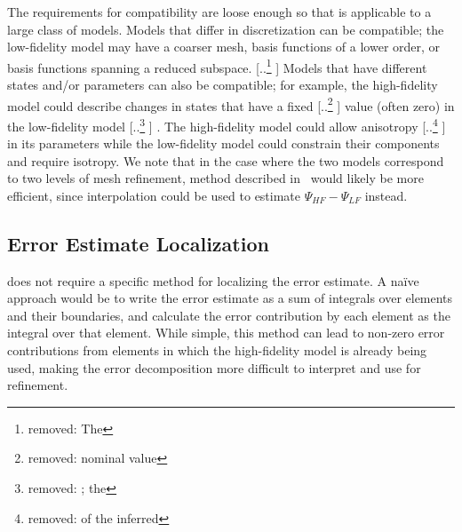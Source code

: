 \documentclass[review,sort&compress]{elsarticle}
\providecommand{\DIFaddtex}[1]{{\protect\color{blue} \sf #1}} %
\providecommand{\DIFdeltex}[1]{{\protect\color{red} [..\footnote{removed: #1} ]}} %
\providecommand{\DIFaddbegin}{} %
\providecommand{\DIFaddend}{} %
\providecommand{\DIFdelbegin}{} %
\providecommand{\DIFdelend}{} %
\providecommand{\DIFadd}[1]{\texorpdfstring{\DIFaddtex{#1}}{#1}} %
\providecommand{\DIFdel}[1]{\texorpdfstring{\DIFdeltex{#1}}{}} %
\newcommand{\DIFscaledelfig}{0.5}
\newlength{\DIFdelgraphicswidth} %
\newlength{\DIFdelgraphicsheight} %
\newcommand{\DIFaddincludegraphics}[2][]{{\color{blue}\fbox{\DIFOincludegraphics[#1]{#2}}}} %
\newcommand{\DIFdelincludegraphics}[2][]{%
\sbox{\DIFdelgraphicsbox}{\DIFOincludegraphics[#1]{#2}}%
\settoboxwidth{\DIFdelgraphicswidth}{\DIFdelgraphicsbox} %
\settoboxtotalheight{\DIFdelgraphicsheight}{\DIFdelgraphicsbox} %
\scalebox{\DIFscaledelfig}{%
\parbox[b]{\DIFdelgraphicswidth}{\usebox{\DIFdelgraphicsbox}\\[-\baselineskip] \rule{\DIFdelgraphicswidth}{0em}}\llap{\resizebox{\DIFdelgraphicswidth}{\DIFdelgraphicsheight}{%
\setlength{\unitlength}{\DIFdelgraphicswidth}%
\begin{picture}(1,1)%
\thicklines\linethickness{2pt} %
{\color[rgb]{1,0,0}\put(0,0){\framebox(1,1){}}}%
{\color[rgb]{1,0,0}\put(0,0){\line( 1,1){1}}}%
{\color[rgb]{1,0,0}\put(0,1){\line(1,-1){1}}}%
\end{picture}%
}\hspace*{3pt}}} %
} %
\DeclareRobustCommand{\DIFaddbegin}{\DIFOaddbegin \let\includegraphics\DIFaddincludegraphics} %
\DeclareRobustCommand{\DIFaddend}{\DIFOaddend \let\includegraphics\DIFOincludegraphics} %
\DeclareRobustCommand{\DIFdelbegin}{\DIFOdelbegin \let\includegraphics\DIFdelincludegraphics} %
\DeclareRobustCommand{\DIFdelend}{\DIFOaddend \let\includegraphics\DIFOincludegraphics} %
\begin{document}
\DIFadd{The requirements for compatibility are loose enough so that \Cref{alg:refSeries} is applicable to a large class of models. Models that differ in discretization can be compatible; the }\DIFaddend low-fidelity model may have a coarser mesh, basis functions of a lower order, or basis functions spanning a reduced subspace. \DIFdelbegin \DIFdel{The }\DIFdelend \DIFaddbegin \DIFadd{Models that have different states and/or parameters can also be compatible; for example, the }\DIFaddend high-fidelity model could describe changes in states that have a fixed \DIFdelbegin \DIFdel{nominal value }\DIFdelend \DIFaddbegin \DIFadd{value (often zero) }\DIFaddend in the low-fidelity model\DIFdelbegin \DIFdel{; the }\DIFdelend \DIFaddbegin \DIFadd{. The }\DIFaddend high-fidelity model could allow anisotropy \DIFdelbegin \DIFdel{of the inferred }\DIFdelend \DIFaddbegin \DIFadd{in its }\DIFaddend parameters while the low-fidelity model could constrain their components and require isotropy. We note that in the case where the two models correspond to two levels of mesh refinement, method described in~\cite{BecVex05} would likely be more efficient, since interpolation could be used to estimate $\Psi_{HF}-\Psi_{LF}$ instead.

\subsection{Error Estimate Localization}\label{sec:errLocal}

 does not require a specific method for localizing the error estimate. A na\"{i}ve approach would be to write the error estimate as a sum of integrals over elements and their boundaries, and calculate the error contribution by each element as the integral over that element. While simple, this method can lead to non-zero error contributions from elements in which the high-fidelity model is already being used, making the error decomposition more difficult to interpret and use for refinement.
\end{document}
